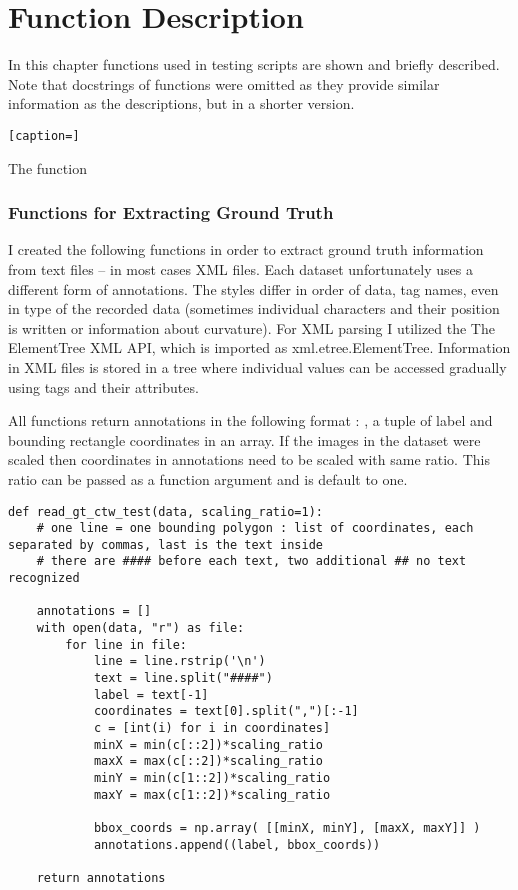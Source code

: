 \chapter{Function Description}

In this chapter functions used in testing scripts are shown and briefly described. Note that docstrings of functions were omitted as they provide similar information as the descriptions, but in a shorter version.                                                    
\begin{lstlisting}[caption=]

\end{lstlisting}

The function \tn{}


\subsection*{Functions for Extracting Ground Truth}

I created the following functions in order to extract ground truth information from  text files -- in most cases XML files. Each dataset unfortunately uses a different form of annotations. The styles differ in order of data, tag names, even in type of the recorded data (sometimes individual characters and their position is written or information about curvature). For XML parsing I utilized the The ElementTree XML API, which is imported as xml.etree.ElementTree. Information in XML files is stored in a tree where individual values can be accessed gradually using tags and their attributes.

All functions return annotations in the following format :
\newline {}, a tuple of label and bounding rectangle coordinates in an array. 
If the images in the dataset were scaled then coordinates in annotations need to be scaled with same ratio. This ratio can be passed as a function argument and is default to one.

\begin{lstlisting}[caption=read\_gt\_ctw\_test]
def read_gt_ctw_test(data, scaling_ratio=1):
    # one line = one bounding polygon : list of coordinates, each separated by commas, last is the text inside 
    # there are #### before each text, two additional ## no text recognized

    annotations = []
    with open(data, "r") as file:
        for line in file:
            line = line.rstrip('\n')
            text = line.split("####")
            label = text[-1]
            coordinates = text[0].split(",")[:-1]
            c = [int(i) for i in coordinates]
            minX = min(c[::2])*scaling_ratio
            maxX = max(c[::2])*scaling_ratio
            minY = min(c[1::2])*scaling_ratio
            maxY = max(c[1::2])*scaling_ratio

            bbox_coords = np.array( [[minX, minY], [maxX, maxY]] )
            annotations.append((label, bbox_coords))

    return annotations
\end{lstlisting}

